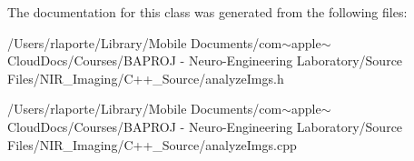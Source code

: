The documentation for this class was generated from the following files\+:\begin{DoxyCompactItemize}
\item 
/\+Users/rlaporte/\+Library/\+Mobile Documents/com$\sim$apple$\sim$\+Cloud\+Docs/\+Courses/\+B\+A\+P\+R\+O\+J -\/ Neuro-\/\+Engineering Laboratory/\+Source Files/\+N\+I\+R\+\_\+\+Imaging/\+C++\+\_\+\+Source/analyze\+Imgs.\+h\item 
/\+Users/rlaporte/\+Library/\+Mobile Documents/com$\sim$apple$\sim$\+Cloud\+Docs/\+Courses/\+B\+A\+P\+R\+O\+J -\/ Neuro-\/\+Engineering Laboratory/\+Source Files/\+N\+I\+R\+\_\+\+Imaging/\+C++\+\_\+\+Source/analyze\+Imgs.\+cpp\end{DoxyCompactItemize}
